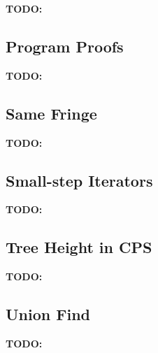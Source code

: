 \documentclass{llncs}
\newcommand{\todo}[1]{\textbf{TODO:}#1}
\begin{document}
\todo

\subsection{Program Proofs}
\label{sec:program-proofs}

\todo

\subsection{Same Fringe}
\label{sec:same-fringe}

\todo

\subsection{Small-step Iterators}
\label{sec:small-step-iterators}

\todo

\subsection{Tree Height in CPS}
\label{sec:tree-height-cps}

\todo

\subsection{Union Find}
\label{sec:union-find}

\todo
\end{document}
